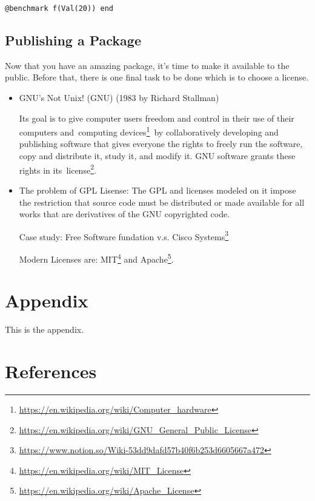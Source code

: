 \documentclass[
  notoc %
]{tufte-book}
\DeclareRobustCommand{\href}[2]{#2\footnote{\url{#1}}}
\begin{document}
\begin{lstlisting}
@benchmark f(Val(20)) end
\end{lstlisting}

\hypertarget{sec:publishing-package}{%
\section{Publishing a Package}\label{sec:publishing-package}}

Now that you have an amazing package, it's time to make it available to
the public. Before that, there is one final task to be done which is to
choose a license.

\begin{itemize}
\item
  GNU's Not Unix! (GNU) (1983 by Richard Stallman)

  Its goal is to give computer users freedom and control in their use of
  their computers
  and~\href{https://en.wikipedia.org/wiki/Computer_hardware}{computing
  devices}~by collaboratively developing and publishing software that
  gives everyone the rights to freely run the software, copy and
  distribute it, study it, and modify it. GNU software grants these
  rights in
  its~\href{https://en.wikipedia.org/wiki/GNU_General_Public_License}{license}.
\item
  The problem of GPL Lisense: The GPL and licenses modeled on it impose
  the restriction that source code must be distributed or made available
  for all works that are derivatives of the GNU copyrighted code.

  Case study:
  \href{https://www.notion.so/Wiki-53dd9dafd57b40f6b253d6605667a472}{Free
  Software fundation v.s. Cisco Systems}

  Modern Licenses are:
  \href{https://en.wikipedia.org/wiki/MIT_License}{MIT} and
  \href{https://en.wikipedia.org/wiki/Apache_License}{Apache}.
\end{itemize}

\hypertarget{appendix}{%
\chapter*{Appendix}\label{appendix}}

This is the appendix.

\hypertarget{references}{%
\chapter{References}\label{references}}

\backmatter
\end{document}
